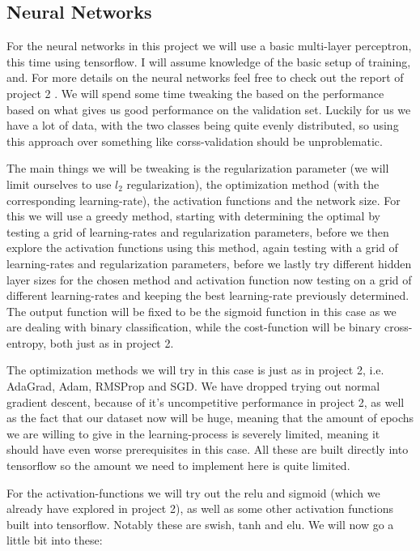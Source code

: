 \documentclass{article}
\begin{document}
\subsection{Neural Networks}
For the neural networks in this project we will use a basic multi-layer
perceptron, this time using tensorflow. I will assume knowledge of the basic
setup of training, and. For more details on the neural networks feel free to
check out the report of project 2 \cite{githubrepoproject2}. We will spend some
time tweaking the based on the performance based on what gives us good
performance on the validation set. Luckily for us we have a lot of data, with
the two classes being quite evenly distributed, so using this approach over
something like corss-validation should be unproblematic.

The main things we will be tweaking is the regularization parameter (we will
limit ourselves to use $l_2$ regularization), the optimization method (with the
corresponding learning-rate), the activation functions and the network size.
For this we will use a greedy method, starting with determining the optimal by
testing a grid of learning-rates and regularization parameters, before we then
explore the activation functions using this method, again testing with a grid
of learning-rates and regularization parameters, before we lastly try different
hidden layer sizes for the chosen method and activation function now testing on
a grid of different learning-rates and keeping the best learning-rate
previously determined. The output function will be fixed to be the sigmoid
function in this case as we are dealing with binary classification, while the
cost-function will be binary cross-entropy, both just as in project 2.

The optimization methods we will try in this case is just as in project 2, i.e.
AdaGrad, Adam, RMSProp and SGD. We have dropped trying out normal gradient
descent, because of it's uncompetitive performance in project 2, as well as the
fact that our dataset now will be huge, meaning that the amount of epochs we
are willing to give in the learning-process is severely limited, meaning it
should have even worse prerequisites in this case. All these are built directly
into tensorflow so the amount we need to implement here is quite limited.

For the activation-functions we will try out the relu and sigmoid (which we
already have explored in project 2), as well as some other activation functions
built into tensorflow. Notably these are swish, tanh and elu. We will now go a
little bit into these:
\end{document}
